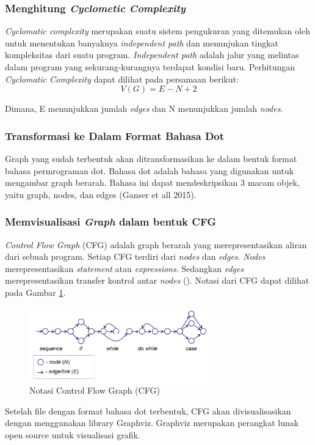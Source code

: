 \subsubsection*{Menghitung \textit{Cyclometic Complexity}}

\textit{Cyclomatic complexity} merupakan suatu sistem pengukuran yang ditemukan oleh \citeauthor{MCCABE} untuk menentukan banyaknya \textit{independent path} dan menunjukan tingkat kompleksitas dari suatu program. \textit{Independent path} adalah jalur yang melintas dalam program yang sekurang-kurangnya terdapat kondisi baru. Perhitungan \textit{Cyclomatic Complexity} dapat dilihat pada persamaan berikut:
\[V(G)=E-N+2\]

Dimana, E menunjukkan jumlah \textit{edges} dan N menunjukkan jumlah \textit{nodes}.

\subsubsection*{Transformasi ke Dalam Format Bahasa Dot}
Graph yang sudah terbentuk akan ditransformasikan ke dalam bentuk format bahasa permrograman dot. Bahasa dot adalah bahasa yang digunakan untuk mengambar graph berarah. Bahasa ini dapat mendeskripsikan 3 macam objek, yaitu graph, nodes, dan edges (Ganser et all 2015).

\subsubsection*{Memvisualisasi \textit{Graph} dalam bentuk CFG}
\textit{Control Flow Graph }(CFG) adalah graph berarah yang merepresentasikan aliran dari sebuah program. Setiap CFG terdiri dari \textit{nodes} dan \textit{edges}. \textit{Nodes} merepresentasikan \textit{statement} atau \textit{expressions}. Sedangkan \textit{edges} merepresentasikan transfer kontrol antar \textit{nodes} (\cite{MCCABE}). Notasi dari CFG dapat dilihat pada Gambar \ref{fig:cfg}.
\begin{figure}[h]
	\centering
	\includegraphics[width=220pt]{gambar/CFG2}
	\caption{Notasi Control Flow Graph (CFG)}
	\label{fig:cfg}
\end{figure}
Setelah file dengan format bahasa dot terbentuk, CFG akan divisualisasikan dengan menggunakan library Graphviz. Graphviz merupakan perangkat lunak open source untuk visualisasi grafik. 

